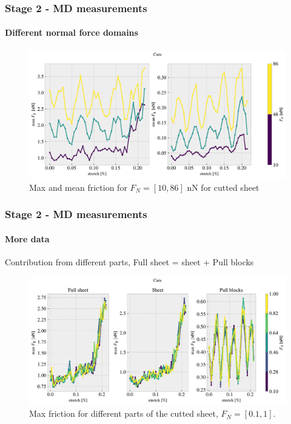 \documentclass[
	10pt, %
]{beamer}
\begin{document}
\begin{frame}
	\frametitle{Stage 2 - MD measurements}
	\framesubtitle{Different normal force domains}
	\begin{figure}
		\includegraphics[width=\linewidth]{figures/max_mean_highFN.pdf}
		\caption{Max and mean friction for $F_N = [10, 86]$ nN for cutted sheet}
	\end{figure}	
\end{frame}


\begin{frame}
	\frametitle{Stage 2 - MD measurements}
	\framesubtitle{More data}

	Contribution from different parts, Full sheet = sheet + Pull blocks
	\begin{figure}
		\includegraphics[width=\linewidth]{figures/max_group.pdf}
		\caption{Max friction for different parts of the cutted sheet, $F_N = [0.1, 1]$.}
	\end{figure}

\end{frame}
\end{document}
